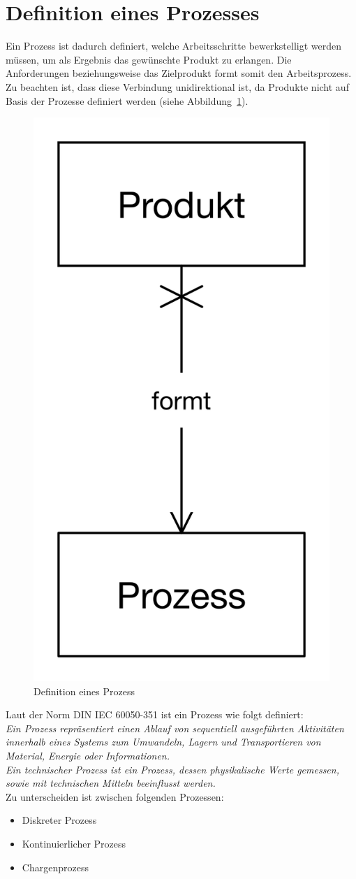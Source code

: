 	\newpage
	\section{Definition eines Prozesses}
	Ein Prozess ist dadurch definiert, welche Arbeitsschritte bewerkstelligt werden müssen, um als Ergebnis das gewünschte Produkt zu erlangen. Die Anforderungen beziehungsweise das Zielprodukt formt somit den Arbeitsprozess. Zu beachten ist, dass diese Verbindung unidirektional ist, da Produkte nicht auf Basis der Prozesse definiert werden (siehe Abbildung~\ref{fig:prozessdef}).
	
	\begin{figure}[h!]
  		\centering
		\includegraphics[height=0.5\textwidth]{graphics/stateoftheart/Prozess.png}
		\caption{Definition eines Prozess}
	  	\label{fig:prozessdef}		
	\end{figure}
	
	Laut der Norm \acs{DIN} \acs{IEC} 60050-351 ist ein Prozess wie folgt definiert:\\
	
	\textit{Ein Prozess repräsentiert einen Ablauf von sequentiell ausgeführten Aktivitäten innerhalb eines Systems zum Umwandeln, Lagern und Transportieren von Material, Energie oder Informationen.}\\
	
	\textit{Ein technischer Prozess ist ein Prozess, dessen physikalische Werte gemessen, sowie mit technischen Mitteln beeinflusst werden.}\cite{mpolke_proc}\\
	
	Zu unterscheiden ist zwischen folgenden Prozessen:
	
	\begin{itemize}
		\item Diskreter Prozess
		\item Kontinuierlicher Prozess
		\item Chargenprozess
	\end{itemize}
	
